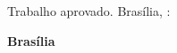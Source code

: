 \thispagestyle{empty}

\begin{center}
    \textbf{\dicname} \\
        \vspace{3.75cm}
    \Large\textbf{\titulo} \\
\end{center}
 
\vspace{2cm} 
\begin{flushright}
    \begin{minipage}{7.5cm}
        \parbox{7.5cm}{\natureza}
    \end{minipage}
\end{flushright}
 
\vspace*{1.5cm}
\noindent Trabalho aprovado. Brasília, \diamesano :
  
\vspace{0.7cm}
\assinatura{\textbf{  \docname      }  \\ }
\assinatura{\textbf{  \cooriename   }     }


\vspace{1cm}
\begin{center}
    {\bf{Brasília} \\ }
    \bf{\ano}
\end{center}